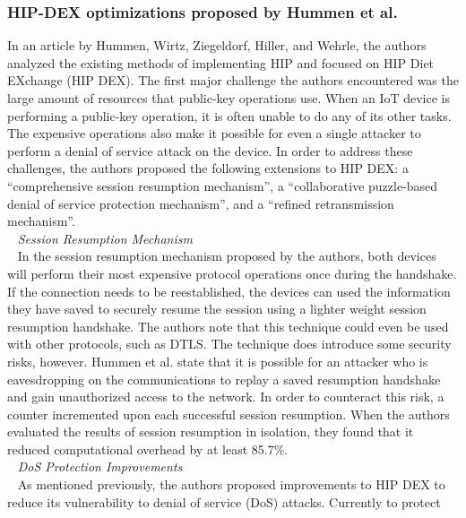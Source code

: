 \documentclass[letterpaper, 12pt]{article}
\begin{document}
\begin{flushleft}
\subsubsection*{HIP-DEX optimizations proposed by Hummen et al.}
In an article by Hummen, Wirtz, Ziegeldorf, Hiller, and Wehrle, the authors analyzed the existing methods of 
implementing HIP and focused on HIP Diet EXchange (HIP DEX). The first major challenge the authors encountered
was the large amount of resources that public-key operations use. When an IoT device is performing a public-key operation,
it is often unable to do any of its other tasks. The expensive operations also make it possible for even a single attacker
to perform a denial of service attack on the device. In order to address these challenges, the authors proposed the following extensions to HIP DEX: 
a ``comprehensive session resumption mechanism'', a ``collaborative puzzle-based denial of service protection mechanism'', and a
``refined retransmission mechanism''. \\
~\newline
\textit{Session Resumption Mechanism}\\ 
~\newline
In the session resumption mechanism proposed by the authors, both devices will perform their most expensive protocol operations once during the handshake.
If the connection needs to be reestablished, the devices can used the information they have saved to securely resume the session using a lighter weight
session resumption handshake. The authors note that this technique could even be used with other protocols, such as DTLS. The technique does introduce some
security risks, however. Hummen et al. state that it is possible for an attacker who is eavesdropping on the communications to replay a saved resumption
handshake and gain unauthorized access to the network. In order to counteract this risk, a counter incremented upon each successful session resumption. 
When the authors evaluated the results of session resumption in isolation, they found that it reduced computational overhead by at least 85.7\%. \\
~\newline
\textit{DoS Protection Improvements}\\ 
~\newline
As mentioned previously, the authors proposed improvements to HIP DEX to reduce its vulnerability to denial of service (DoS) attacks. Currently to protect

\end{flushleft}
\end{document}
